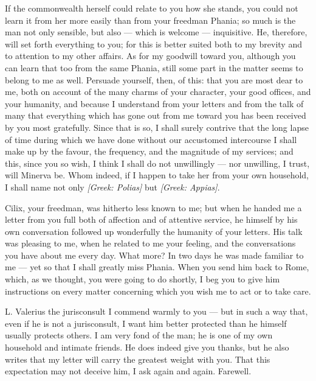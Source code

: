 

 If the commonwealth herself could relate to you how she stands, you could not learn it from her more easily than from your freedman Phania; so much is the man not only sensible, but also --- which is welcome --- inquisitive. He, therefore, will set forth everything to you; for this is better suited both to my brevity and to attention to my other affairs. As for my goodwill toward you, although you can learn that too from the same Phania, still some part in the matter seems to belong to me as well. Persuade yourself, then, of this: that you are most dear to me, both on account of the many charms of your character, your good offices, and your humanity, and because I understand from your letters and from the talk of many that everything which has gone out from me toward you has been received by you most gratefully. Since that is so, I shall surely contrive that the long lapse of time during which we have done without our accustomed intercourse I shall make up by the favour, the frequency, and the magnitude of my services; and this, since you so wish, I think I shall do not unwillingly --- nor unwilling, I trust, will Minerva be. Whom indeed, if I happen to take her from your own household, I shall name not only \textit{[Greek: Polias]} but \textit{[Greek: Appias]}.

 Cilix, your freedman, was hitherto less known to me; but when he handed me a letter from you full both of affection and of attentive service, he himself by his own conversation followed up wonderfully the humanity of your letters. His talk was pleasing to me, when he related to me your feeling, and the conversations you have about me every day. What more? In two days he was made familiar to me --- yet so that I shall greatly miss Phania. When you send him back to Rome, which, as we thought, you were going to do shortly, I beg you to give him instructions on every matter concerning which you wish me to act or to take care.

 L. Valerius the jurisconsult I commend warmly to you --- but in such a way that, even if he is not a jurisconsult, I want him better protected than he himself usually protects others. I am very fond of the man; he is one of my own household and intimate friends. He does indeed give you thanks, but he also writes that my letter will carry the greatest weight with you. That this expectation may not deceive him, I ask again and again. Farewell.
